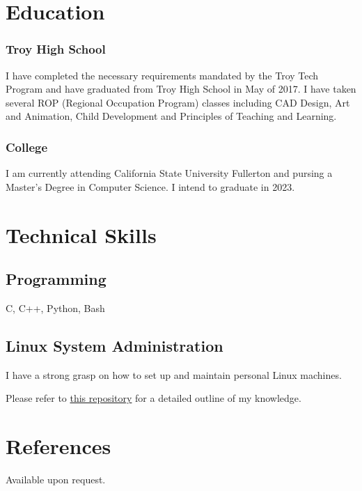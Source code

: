 \documentclass{article}
\begin{document}
\section{Education}

\subsubsection{Troy High School}

I have completed the necessary requirements mandated by the Troy Tech Program and have graduated from Troy High School in May of 2017. I have taken several ROP (Regional Occupation Program) classes including CAD Design, Art and Animation, Child Development and Principles of Teaching and Learning.

\subsubsection{College}

I am currently attending California State University Fullerton and pursing a Master's Degree in Computer Science. I intend to graduate in 2023.

\section{Technical Skills}

\subsection{Programming}
C, C++, Python, Bash

\subsection{Linux System Administration}

I have a strong grasp on how to set up and maintain personal Linux machines.

Please refer to \href{https://github.com/JaredDyreson/Thin-Mint}{this repository} for a detailed outline of my knowledge.

\section{References}

Available upon request.
\end{document}
